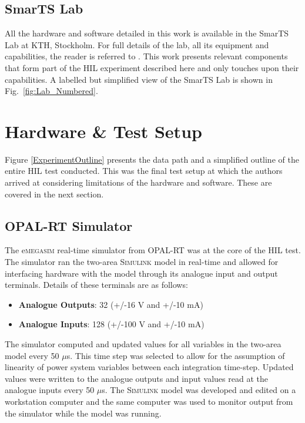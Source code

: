 \documentclass[conference]{IEEEtran}
\begin{document}
\subsection{SmarTS Lab}
All the hardware and software detailed in this work is available in the SmarTS Lab at KTH, Stockholm. For full details of the lab, all its equipment and capabilities, the reader is referred to \cite{SmarTSLab}. This work presents relevant components that form part of the HIL experiment described here and only touches upon their capabilities. A labelled but simplified view of the SmarTS Lab is shown in Fig.~\ref{fig:Lab_Numbered}.

\section{Hardware \& Test Setup}\label{hardware}

Figure \ref{ExperimentOutline} presents the data path and a simplified outline of the entire HIL test conducted. This was the final test setup at which the authors arrived at considering limitations of the hardware and software. These are covered in the next section.

\subsection{OPAL-RT Simulator}
The e\textsc{megasim} real-time simulator from OPAL-RT\cite{OPALemegasim} was at the core of the HIL test. The simulator ran the two-area \textsc{Simulink} model in real-time and allowed for interfacing hardware with the model through its analogue input and output terminals.  Details of these terminals are as follows:

\begin{itemize}
\item \textbf{Analogue Outputs}: 32 (+/-16 V and +/-10 mA)
\item \textbf{Analogue Inputs}: 128 (+/-100 V and +/-10 mA)
\end{itemize}

The simulator computed and updated values for all variables in the two-area model every 50 $\mu$s. This time step was selected to allow for the assumption of linearity of power system variables between each integration time-step. Updated values were written to the analogue outputs and input values read at the analogue inputs every 50 $\mu$s. The \textsc{Simulink} model was developed and edited on a workstation computer and the same computer was used to monitor output from the simulator while the model was running.
\end{document}
